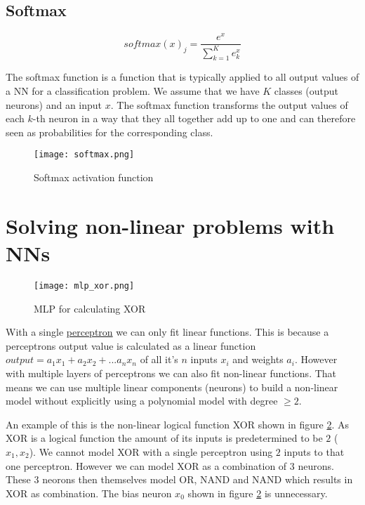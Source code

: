 \subsection{Softmax}

$$
    softmax(x)_{j} = \frac{e^{x}}{\sum_{k=1}^{K}e_{k}^{x}}
$$


The softmax function is a function that is typically applied to all output values of a NN for a classification problem. We assume that we have $K$ classes (output neurons) and an input $x$. The softmax function transforms the output values of each $k$-th neuron in a way that they all together add up to one and can therefore seen as probabilities for the corresponding class.

\begin{figure}[h]
    \centering
    \texttt{[image: softmax.png]}
    \caption{Softmax activation function}
    \label{fig:softmax}
\end{figure}

\section{Solving non-linear problems with NNs}

\label{sec:solving_non_linear_problems_with_nns}

\begin{figure}[h]
    \centering
    \texttt{[image: mlp\_xor.png]}
    \caption{MLP for calculating XOR}
    \label{fig:mlp_xor}
\end{figure}

With a single \hyperref[sec:mlp]{perceptron} we can only fit linear functions. This is because a perceptrons output value is calculated as a linear function $output = a_{1} x_{1} + a_{2} x_{2} + ... a_{n} x_{n}$ of all it's $n$ inputs $x_{i}$ and weights $a_{i}$. However with multiple layers of perceptrons we can also fit non-linear functions. That means we can use multiple linear components (neurons) to build a non-linear model without explicitly using a polynomial model with degree $\geq 2$.

An example of this is the non-linear logical function XOR shown in figure \ref{fig:mlp_xor}. As XOR is a logical function the amount of its inputs is predetermined to be $2$ ($x_{1}, x_{2}$). We cannot model XOR with a single perceptron using $2$ inputs to that one perceptron. However we can model XOR as a combination of 3 neurons. These 3 neorons then themselves model OR, NAND and NAND which results in XOR as combination. The bias neuron $x_{0}$ shown in figure \ref{fig:mlp_xor} is unnecessary.

